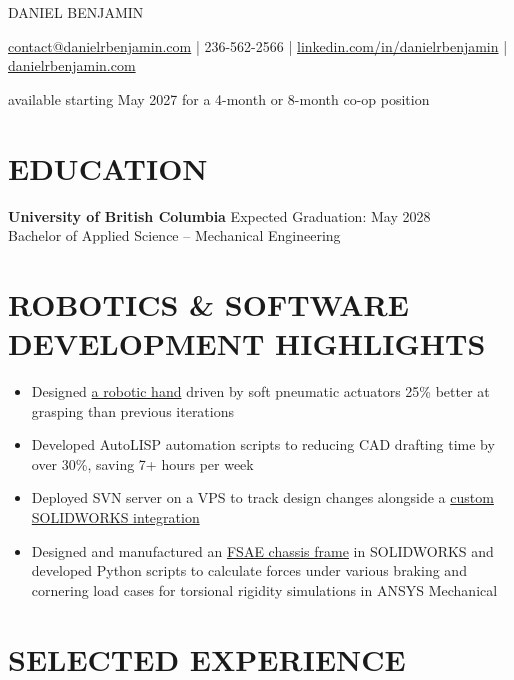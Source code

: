 \documentclass[11pt]{article}       %
\begin{document}
\centerline{\Huge \color{accentColour} DANIEL BENJAMIN}

\vspace{5pt}

\centerline{\href{mailto:contact@danielrbenjamin.com}{contact@danielrbenjamin.com} | 236-562-2566 | \href{https://www.linkedin.com/in/danielrbenjamin}{linkedin.com/in/danielrbenjamin} | \href{https://www.danielrbenjamin.com/}{danielrbenjamin.com}}

\centerline{available starting May 2027 for a 4-month or 8-month co-op position}

\vspace{-6.5pt}

\section*{EDUCATION}
\textbf{University of British Columbia} \hfill Expected Graduation: May 2028
\\Bachelor of Applied Science – Mechanical Engineering

\vspace{-6.5pt}

\section*{ROBOTICS \& SOFTWARE DEVELOPMENT HIGHLIGHTS}
\begin{itemize}
  \item Designed \href{https://www.danielrbenjamin.com/projects/mems-hand/}{a robotic hand} driven by soft pneumatic actuators 25\% better at grasping than previous iterations
  \item Developed AutoLISP automation scripts to  reducing CAD drafting time by over 30\%, saving 7+ hours per week
  \item Deployed SVN server on a VPS to track design changes alongside a \href{https://www.danielrbenjamin.com/projects/cad-infra/}{custom SOLIDWORKS integration}
  \item Designed and manufactured an \href{https://www.danielrbenjamin.com/projects/fsae-chassis/}{FSAE chassis frame} in SOLIDWORKS and developed Python scripts to calculate forces under various braking and cornering load cases for torsional rigidity simulations in ANSYS Mechanical
\end{itemize}

\section*{SELECTED EXPERIENCE}
\end{document}
